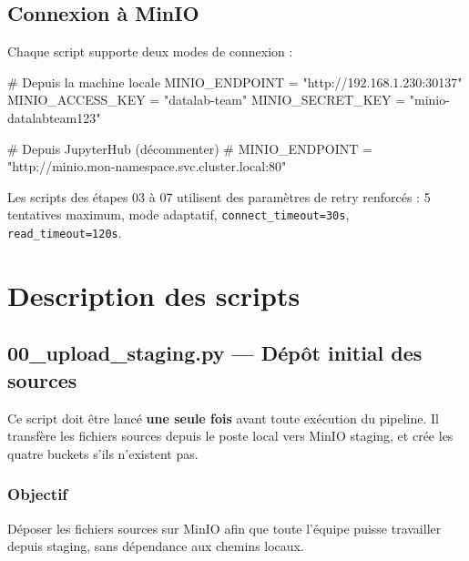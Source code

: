\documentclass[12pt,a4paper,french]{report}
\begin{document}
\section{Connexion à MinIO}

Chaque script supporte deux modes de connexion :

\begin{codebox}
# Depuis la machine locale
MINIO\_ENDPOINT   = "http://192.168.1.230:30137"
MINIO\_ACCESS\_KEY = "datalab-team"
MINIO\_SECRET\_KEY = "minio-datalabteam123"

# Depuis JupyterHub (décommenter)
# MINIO\_ENDPOINT = "http://minio.mon-namespace.svc.cluster.local:80"
\end{codebox}

Les scripts des étapes 03 à 07 utilisent des paramètres de retry renforcés :
5 tentatives maximum, mode adaptatif, \texttt{connect\_timeout=30s},
\texttt{read\_timeout=120s}.

\chapter{Description des scripts}

\section{00\_upload\_staging.py — Dépôt initial des sources}

\begin{warningbox}
  Ce script doit être lancé \textbf{une seule fois} avant toute exécution du
  pipeline. Il transfère les fichiers sources depuis le poste local vers
  MinIO staging, et crée les quatre buckets s'ils n'existent pas.
\end{warningbox}

\subsection{Objectif}

Déposer les fichiers sources sur MinIO afin que toute l'équipe puisse
travailler depuis staging, sans dépendance aux chemins locaux.
\end{document}
